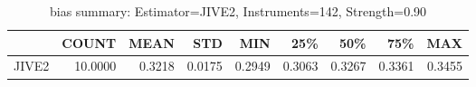\begin{table}[ht]
\centering
\caption{bias summary: Estimator=JIVE2, Instruments=142, Strength=0.90}
\begin{tabular}{lrrrrrrrr}
\toprule
 & COUNT & MEAN & STD & MIN & 25\% & 50\% & 75\% & MAX \\
\midrule
JIVE2 & 10.0000 & 0.3218 & 0.0175 & 0.2949 & 0.3063 & 0.3267 & 0.3361 & 0.3455 \\
\bottomrule
\end{tabular}
\end{table}
